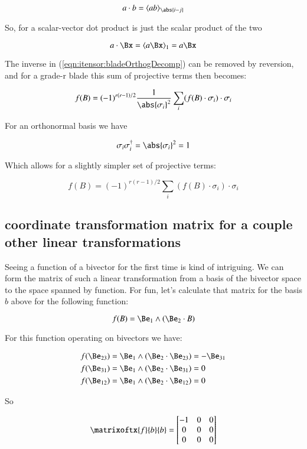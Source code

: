 \[
a \cdot b = \langle a b \rangle_{\abs{i-j}}
\]

So, for a scalar-vector dot product is just the scalar product of the two

\[
a \cdot \Bx = \langle{ a \Bx }\rangle_1 = a \Bx
\]

The inverse in (\ref{eqn:itensor:bladeOrthogDecomp}) can be removed by reversion, and for a grade-r blade this sum of projective terms then becomes:

\begin{equation}
f(B) = (-1)^{r(r-1)/2} \frac{1}{{\abs{\sigma_i}}^2}\sum_i (f(B) \cdot \sigma_i) \cdot {\sigma_i}
\end{equation}

For an orthonormal basis we have

\[
\sigma_i \sigma_i^\dagger = \abs{\sigma_i}^2 = 1
\]

Which allows for a slightly simpler set of projective terms:

\begin{equation}
f(B) = (-1)^{r(r-1)/2} \sum_i (f(B) \cdot \sigma_i) \cdot {\sigma_i}
\end{equation}\label{eqn:itensor:OrthonormalDecomp}

\subsection{coordinate transformation matrix for a couple other linear transformations }

Seeing a function of a bivector for the first time is kind of intriguing.  We can form the matrix of such a linear transformation
from a basis of the bivector space to the space spanned by function.  For fun, let's calculate that matrix for the basis $b$ above
for the following function:

\[
f(B) = \Be_1 \wedge (\Be_2 \cdot B)
\]

For this function operating on  bivectors we have:

\begin{align*}
f(\Be_{23}) &= \Be_1 \wedge (\Be_2 \cdot \Be_{23}) = -\Be_{31} \\
f(\Be_{31}) &= \Be_1 \wedge (\Be_2 \cdot \Be_{31}) = 0 \\
f(\Be_{12}) &= \Be_1 \wedge (\Be_2 \cdot \Be_{12}) = 0 \\
\end{align*}

So

\[
\matrixoftx{f}{b}{b}
= 
\begin{bmatrix}
-1 & 0 & 0 \\
0 & 0 & 0 \\
0 & 0 & 0 \\
\end{bmatrix}
\]

